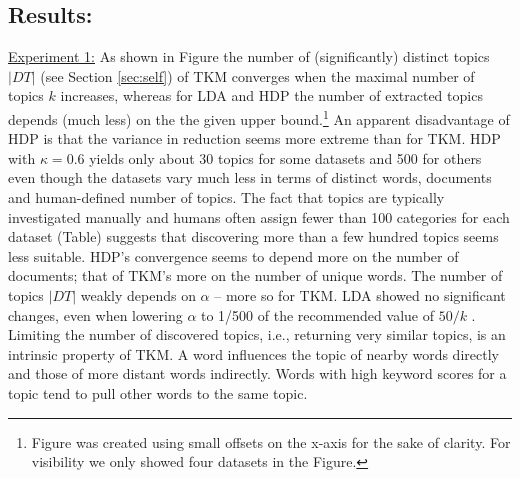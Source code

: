 \documentclass[twocolumn,10]{article}
\begin{document}
	\subsection{Results:}
	\underline{Experiment 1:} As shown in Figure the number of (significantly) distinct topics $|DT|$ (see Section \ref{sec:self}) of TKM converges when the maximal number of topics $k$ increases, whereas for LDA and HDP the number of extracted topics depends (much less) on the the given upper bound.\footnote{Figure was created using small offsets on the x-axis for the sake of clarity. For visibility we only showed four datasets in the Figure.} An apparent disadvantage of HDP is that the variance in reduction seems more extreme than for TKM. HDP with $\kappa=0.6$ yields only about 30 topics for some datasets and 500 for others even though the datasets vary much less in terms of distinct words, documents and human-defined number of topics. The fact that topics are typically investigated manually and humans often assign fewer than 100 categories for each dataset (Table) suggests that discovering more than a few hundred topics seems less suitable. HDP's convergence seems to depend more on the number of documents; that of TKM's more on the number of unique words. The number of topics $|DT|$ weakly depends on $\alpha$ -- more so for TKM. LDA showed no significant changes, even when lowering $\alpha$ to 1/500 of the recommended value of $50/k$ \cite{gri04b}. Limiting the number of discovered topics, i.e., returning very similar topics, is an intrinsic property of TKM.  A word influences the topic of nearby words directly and those of more distant words indirectly. Words with high keyword scores for a topic tend to pull other words to the same topic. \smallskip\\ 
	
\end{document}
